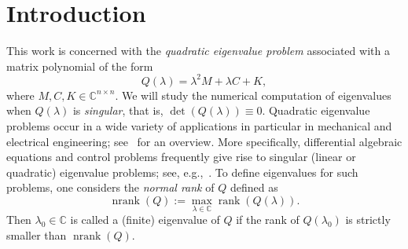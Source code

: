 \documentclass[12pt]{article}
\newcommand{\C}{\mathbb{C}}
\DeclareMathOperator{\nrank}{nrank}
\DeclareMathOperator{\rank}{rank}
\begin{document}
\begin{abstract}
The numerical solution of singular eigenvalue problems is complicated by the fact that small perturbations of the coefficients may have an arbitrarily bad effect on eigenvalue accuracy. However, it has been known for a long time that such perturbations are exceptional and standard eigenvalue solvers, such as the QZ algorithm, tend to yield good accuracy despite the inevitable presence of roundoff error.
Recently, Lotz and Noferini quantified this phenomenon by introducing the concept of $\delta$-weak eigenvalue condition numbers. In this work, we consider singular quadratic eigenvalue problems and two popular linearizations. Our results show that a correctly chosen linearization increases $\delta$-weak eigenvalue condition numbers only marginally, justifying the use of these linearizations in numerical solvers also in the singular case. We propose a very simple but often effective algorithm for computing well-conditioned eigenvalues of a singular quadratic eigenvalue problems by adding small random perturbations to the coefficients. We prove that the eigenvalue condition number is, with high probability, a reliable criterion for detecting and excluding spurious eigenvalues created from the singular part.
\end{abstract}



\section{Introduction}


This work is concerned with the \emph{quadratic eigenvalue problem} associated with a matrix polynomial of the form
\begin{equation}\label{eq:qep}
    Q(\lambda) = \lambda^2M + \lambda C + K, 
\end{equation}
where $M, C, K \in \mathbb{C}^{n\times n}$. We will study the numerical computation of eigenvalues when $Q(\lambda)$ is \emph{singular}, that is, $\det (Q(\lambda)) \equiv 0$.
Quadratic eigenvalue problems occur in a wide variety of applications in particular in mechanical and electrical engineering; see~\cite{Tisseur2001} for an overview. More specifically, differential algebraic equations and control problems frequently give rise to
singular (linear or quadratic) eigenvalue problems; see, e.g.,~\cite{byers2008trimmed,Shi2004,VanDooren1981}. To define eigenvalues for such problems, one considers the \emph{normal rank} of $Q$ defined as \[ \nrank(Q) := \max_{\lambda \in\mathbb{C}}\rank(Q(\lambda)).\] Then 
$\lambda_0 \in \C$ is called a (finite) eigenvalue of $Q$ if the rank of $Q(\lambda_0)$ is strictly smaller than $\nrank(Q)$.
\end{document}
